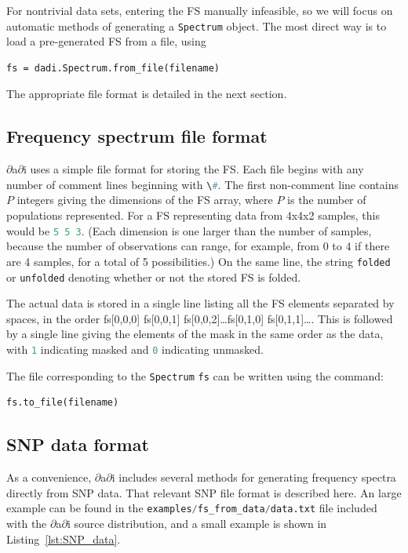 \documentclass[12pt]{article}
\makeatletter
\newcommand{\dadi}{$\partial$a$\partial$i\xspace}
\newcommand{\py}[1]{\lstinline[language=Python, showstringspaces=False]@#1@}
\makeatother
\begin{document}
For nontrivial data sets, entering the FS manually infeasible, so we will focus on automatic methods of generating a \py{Spectrum} object.
The most direct way is to load a pre-generated FS from a file, using
\begin{lstlisting}
fs = dadi.Spectrum.from_file(filename)
\end{lstlisting}
The appropriate file format is detailed in the next section.

\subsection{Frequency spectrum file format}

\dadi uses a simple file format for storing the FS.
Each file begins with any number of comment lines beginning with \py{\#}.
The first non-comment line contains $P$ integers giving the dimensions of the FS array, where $P$ is the number of populations represented.
For a FS representing data from 4x4x2 samples, this would be \py{5 5 3}.
(Each dimension is one larger than the number of samples, because the number of observations can range, for example, from 0 to 4 if there are 4 samples, for a total of 5 possibilities.)
On the same line, the string \py{folded} or \py{unfolded} denoting whether or not the stored FS is folded.

The actual data is stored in a single line listing all the FS elements separated by spaces, in the order fs[0,0,0] fs[0,0,1] fs[0,0,2]\dots fs[0,1,0] fs[0,1,1]\dots.
This is followed by a single line giving the elements of the mask in the same order as the data, with \py{1} indicating masked and \py{0} indicating unmasked.

The file corresponding to the \py{Spectrum} \py{fs} can be written using the command:
\begin{lstlisting}
fs.to_file(filename)
\end{lstlisting}

\subsection{SNP data format}

As a convenience, \dadi includes several methods for generating frequency spectra directly from SNP data.
That relevant SNP file format is described here.
An large example can be found in the \py{examples/fs_from_data/data.txt} file included with the \dadi source distribution, and a small example is shown in Listing~\ref{lst:SNP_data}.
\end{document}
